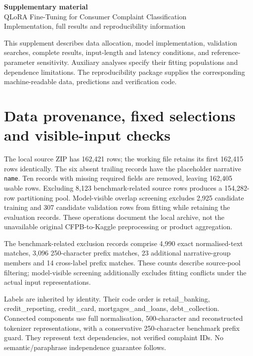 \documentclass[10pt,a4paper]{article}
\begin{document}
\begin{center}{\Large\bfseries Supplementary material}\\[5pt]
{\large QLoRA Fine-Tuning for Consumer Complaint Classification}\\[5pt]
Implementation, full results and reproducibility information
\end{center}
This supplement describes data allocation, model implementation, validation searches, complete results, input-length and latency conditions, and reference-parameter sensitivity. Auxiliary analyses specify their fitting populations and dependence limitations. The reproducibility package supplies the corresponding machine-readable data, predictions and verification code.
\tableofcontents
\clearpage


\section{Data provenance, fixed selections and visible-input checks}\label{sup:data}


The local source ZIP has 162,421 rows; the working file retains its first 162,415 rows identically. The six absent trailing records have the placeholder narrative \texttt{name}. Ten records with missing required fields are removed, leaving 162,405 usable rows. Excluding 8,123 benchmark-related source rows produces a 154,282-row partitioning pool. Model-visible overlap screening excludes 2,925 candidate training and 307 candidate validation rows from fitting while retaining the evaluation records. These operations document the local archive, not the unavailable original CFPB-to-Kaggle preprocessing or product aggregation.

The benchmark-related exclusion records comprise 4,990 exact normalised-text matches, 3,096 250-character prefix matches, 23 additional narrative-group members and 14 cross-label prefix matches. These counts describe source-pool filtering; model-visible screening additionally excludes fitting conflicts under the actual input representations.

Labels are inherited by identity. Their code order is retail\_banking, credit\_reporting, credit\_card, mortgages\_and\_loans, debt\_collection. Connected components use full normalisation, 500-character and reconstructed tokenizer representations, with a conservative 250-character benchmark prefix guard. They represent text dependencies, not verified complaint IDs. No semantic/paraphrase independence guarantee follows.
\end{document}

